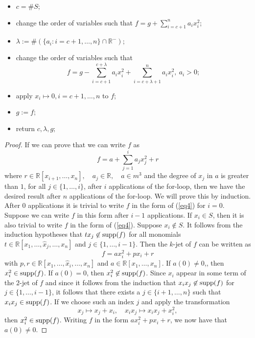 \documentclass{amsproc}
\begin{document}
\begin{itemize}
\item $c =\# S$; 
\item change the order of variables such that $\displaystyle f=g+\sum_{i=c+1}^na_ix_i^2$;
\item $\lambda:=\#(\{a_i:i=c+1,\ldots,n\}\cap\mathbb R^-)$;
\item change the order of variables such that \[f=g-\sum_{i=c+1}^{c+\lambda}a_ix_i^2+\sum_{i=c+\lambda+1}^na_ix_i^2,\  a_i>0;\]
\item apply $x_i\mapsto 0, i=c+1,\ldots,n$ to $f$;
\item $g:=f$;
\item return $c, \lambda, g$;
\end{itemize}

\begin{proof}
If we can prove that we can write $f$ as \begin{equation}\label{eq4}
f=a+\sum_{j=1}^i a_jx_j^2+r
\end{equation}
where
$r\in\mathbb R[x_{i+1},\ldots,x_n],\quad a_j\in\mathbb R,\quad a\in m^3$ and the degree of $x_j$ in $a$ is greater than $1$, for all $j\in\{1,\ldots,i\}$,
after $i$ applications of the for-loop, then we have the desired result after
$n$ applications of the for-loop. We will prove this by induction. After $0$
applications it is trivial to write $f$ in the form of (\ref{eq4}) for $i=0$.
Suppose we can write $f$ in this form after $i-1$ applications. If $x_i\in S$, then it is also trivial to write $f$ in the form of (\ref{eq4}). Suppose  $x_i\not\in S$. It follows from the induction hypotheses that $tx_j\not\in \textnormal{supp}(f)$ for all monomials $t\in\mathbb R[x_1,\ldots,\hat x_j,\ldots,x_n]$ and $j\in\{1,\ldots,i-1\}$. Then the $k$-jet of $f$ can be written as
\[f=ax_i^2+px_i+r\]
with $p,r\in\mathbb R[x_1,\ldots,\hat x_i,\ldots,x_n]$ and $a\in\mathbb
R[x_1,\ldots,x_n]$. If $a(0)\neq 0$,, then $x_i^2\in\textnormal{supp}(f)$. If
$a(0)=0$, then $x_i^2\not\in\textnormal{supp}(f)$. Since $x_i$ appear in some
term of the $2$-jet of $f$ and since it follows from the induction that
$x_ix_j\not\in\textnormal{supp}(f)$ for $j\in\{1,\ldots,i-1\}$, it follows that
there exists a $j\in\{i+1,\ldots,n\}$ such that $x_ix_j\in\textnormal{supp}(f)$.
If we choose such an index $j$ and apply the transformation
\begin{equation}\label{eq2}
x_j\mapsto x_j+x_i,\quad x_ix_j\mapsto x_ix_j+x_i^2,
\end{equation}
then $x_i^2\in\textnormal{supp}(f)$. Writing $f$ in the form $ax_i^2+px_i+r$, we now have that $a(0)\neq0$.


\end{proof}
\end{document}
